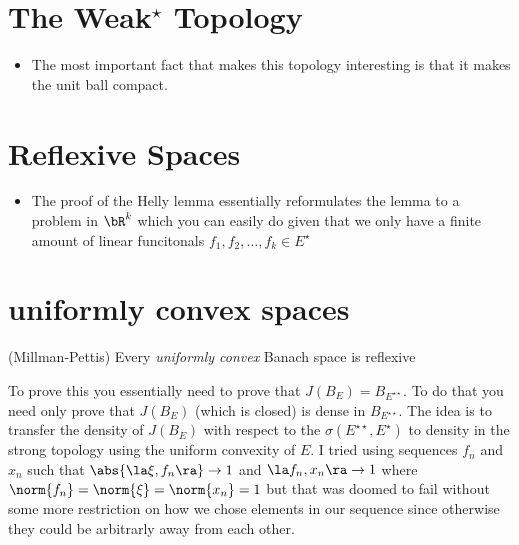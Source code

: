 \documentclass{pset}
\begin{document}
\maketitle

\pagebreak 
\section{The Weak${}^\star$ Topology}
\begin{itemize}
    \item The most important fact that makes this topology interesting is that it makes the unit ball compact.
\end{itemize}

\section{Reflexive Spaces}
\begin{itemize}
    \item The proof of the Helly lemma essentially reformulates the lemma to a problem in $\bR^k$ which you can easily do given that we only have a finite amount of linear funcitonals $f_1, f_2, \dots, f_k\in E^\star$
\end{itemize}
\section{uniformly convex spaces}
\begin{theorem}(Millman-Pettis)
    Every \emph{uniformly convex} Banach space is reflexive
\end{theorem}
\begin{remark}
    To prove this you essentially need to prove that $J(B_E) = B_{E^{\star\star}}$. To do that you need only prove that $J(B_E)$ (which is closed) is dense in $B_{E^{\star\star}}$. The idea is to transfer the density of $J(B_E)$ with respect to the $\sigma(E^{\star\star}, E^\star)$ to density in the strong topology using the uniform convexity of $E$. I tried using sequences $f_n$ and $x_n$ such that $\abs{\la \xi, f_n \ra} \to 1$ and $\la f_n, x_n \ra\to 1$ where $\norm{f_n}=\norm{\xi}=\norm{x_n}=1$ but that was doomed to fail without some more restriction on how we chose elements in our sequence since otherwise they could be arbitrarly away from each other.
\end{remark}
\end{document}
